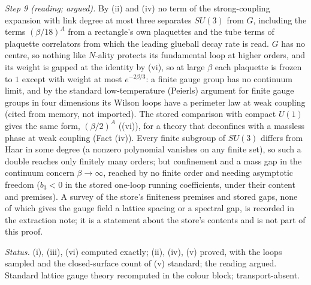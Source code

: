\emph{Step 9 (reading; argued).} By (ii) and (iv) no term of the strong-coupling expansion with link degree at most three separates $SU(3)$ from $G$, including the terms $(\beta/18)^{A}$ from a rectangle's own plaquettes and the tube terms of plaquette correlators from which the leading glueball decay rate is read. $G$ has no centre, so nothing like $N$-ality protects its fundamental loop at higher orders, and its weight is gapped at the identity by (vi), so at large $\beta$ each plaquette is frozen to $1$ except with weight at most $e^{-2\beta/3}$: a finite gauge group has no continuum limit, and by the standard low-temperature (Peierls) argument for finite gauge groups in four dimensions its Wilson loops have a perimeter law at weak coupling (cited from memory, not imported). The stored comparison with compact $U(1)$ gives the same form, $(\beta/2)^{A}$ ((vi)), for a theory that deconfines with a massless phase at weak coupling (Fact (iv)). Every finite subgroup of $SU(3)$ differs from Haar in some degree (a nonzero polynomial vanishes on any finite set), so such a double reaches only finitely many orders; but confinement and a mass gap in the continuum concern $\beta \to \infty$, reached by no finite order and needing asymptotic freedom ($b_{3} < 0$ in the stored one-loop running coefficients, under their content and premises). A survey of the store's finiteness premises and stored gaps, none of which gives the gauge field a lattice spacing or a spectral gap, is recorded in the extraction note; it is a statement about the store's contents and is not part of this proof.

\emph{Status.} (i), (iii), (vi) computed exactly; (ii), (iv), (v) proved, with the loops sampled and the closed-surface count of (v) standard; the reading argued. Standard lattice gauge theory recomputed in the colour block; transport-absent.
